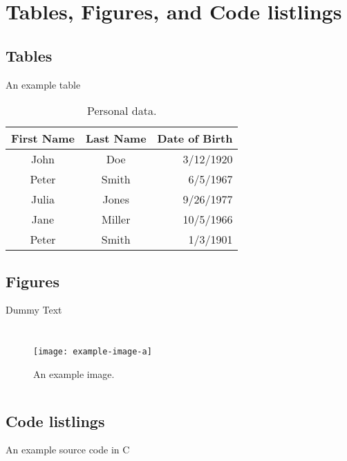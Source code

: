 \section{Tables, Figures, and Code listlings}

\subsection{Tables}

\begin{frame}{An example table}
\begin{table}[t]
    \begin{tabular}{ccr}
        \toprule
        First Name & Last Name & Date of Birth \\
        \midrule
        John    & Doe       & 3/12/1920 \\
        Peter   & Smith     & 6/5/1967 \\
        Julia   & Jones     & 9/26/1977 \\
        Jane    & Miller    & 10/5/1966 \\
        Peter   & Smith     & 1/3/1901 \\
        \bottomrule
    \end{tabular}
    \caption{Personal data.}
\end{table}
\end{frame}

\subsection{Figures}

\begin{frame}{Dummy Text}
\begin{columns}
 \justifying
\scriptsize \lipsum[1]

\begin{figure}
    \centering
     \texttt{[image: example-image-a]}
     \caption{An example image.}
\end{figure}
\end{columns}
\end{frame}

\subsection{Code listlings}

\begin{frame}{An example source code in C}
\sleepSort
\end{frame}
